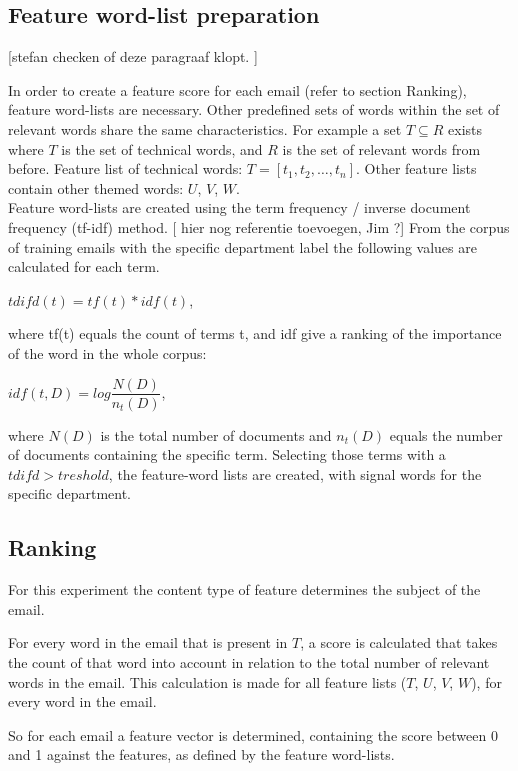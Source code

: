 \documentclass[journal]{IEEEtran}
\begin{document}
\subsection{Feature word-list preparation}

[stefan checken of deze paragraaf klopt. ]

In order to create a feature score for each email (refer to section Ranking), feature word-lists are necessary. Other predefined sets of words within the set of relevant words share the same characteristics. For example a set $T \subseteq R$ exists where $T$
is the set of technical words, and $R$ is the set of relevant words from before. Feature list of technical words: $T = [t_1, t_2, \dots, t_n]$.
Other feature lists contain other themed words: $U$, $V$, $W$.\\

Feature word-lists are created using the term frequency / inverse document frequency (tf-idf) method. [ hier nog referentie toevoegen, Jim ?] From the corpus of training emails with the specific department label the following values are calculated for each term. 
\begin{center}
    $tdifd(t) = tf(t) * idf(t)$,
\end{center}
where tf(t) equals the count of terms t, and idf give a ranking of the importance of the word in the whole corpus: 
\begin{center}
    $idf(t, D) = log\dfrac{N(D)}{n_t(D)}$, 
\end{center}
where $N(D)$ is the total number of documents and $n_t(D)$ equals the number of documents containing the specific term. 
Selecting those terms with a $tdifd > treshold$, the feature-word lists are created, with signal words for the specific department.

\subsection{Ranking}

For this experiment the content type of feature determines the subject of the email.

For every word in the email that is present in $T$, a score is calculated that takes the count of that word into account in relation to the total number of relevant words in the email. This calculation is made for all feature lists ($T$, $U$, $V$, $W$), for every word in the email. 

So for each email a feature vector is determined, containing the score between 0 and 1 against the features, as defined by the feature word-lists. 
\end{document}
